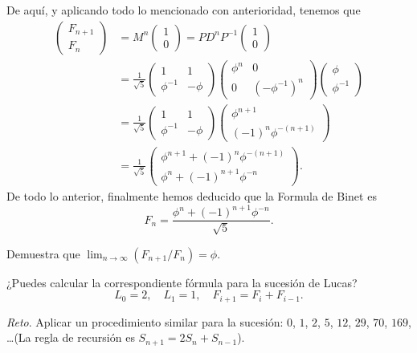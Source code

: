 De aquí, y aplicando todo lo mencionado con anterioridad, tenemos que
\begin{align*}
  \begin{pmatrix} F_{n+1} \\ F_n \end{pmatrix}
    &= M^n \begin{pmatrix} 1 \\ 0 \end{pmatrix}  = P D^n P^{-1} \begin{pmatrix} 1 \\ 0 \end{pmatrix} \\
    &= \frac{1}{\sqrt{5}} \begin{pmatrix} 1 & 1 \\ \phi^{-1} & -\phi \end{pmatrix}
        \begin{pmatrix} \phi^n & 0 \\ 0 & (-\phi^{-1})^n \end{pmatrix}
        \begin{pmatrix} \phi \\ \phi^{-1} \end{pmatrix} \\
    &= \frac{1}{\sqrt{5}} \begin{pmatrix} 1 & 1 \\ \phi^{-1} & -\phi \end{pmatrix}
        \begin{pmatrix} \phi^{n+1} \\ (-1)^n \phi^{-(n+1)} \end{pmatrix} \\
    &= \frac{1}{\sqrt{5}} \begin{pmatrix}
          \phi^{n+1} + (-1)^n \phi^{-(n+1)} \\
          \phi^n + (-1)^{n+1} \phi^{-n}
        \end{pmatrix}.
\end{align*}
De todo lo anterior, finalmente hemos deducido que la Formula de Binet es
\[
  F_n = \frac{\phi^n + (-1)^{n+1} \phi^{-n} }{\sqrt{5}}.
\]

\ExerciseSection

\begin{exerciselist}
  \item Demuestra que $\lim_{n\to\infty} (F_{n+1}/F_n) = \phi$.
  
  \item ¿Puedes calcular la correspondiente fórmula para la sucesión de Lucas?
  \[
    L_0 = 2, \quad L_1 = 1, \quad F_{i+1} = F_i + F_{i-1}.
  \]

  \item \emph{Reto}. Aplicar un procedimiento similar para la sucesión: $0$, $1$, $2$, $5$, $12$, $29$, $70$, $169$, \dots (La regla de recursión es $S_{n+1} = 2S_{n} + S_{n-1}$).
\end{exerciselist}